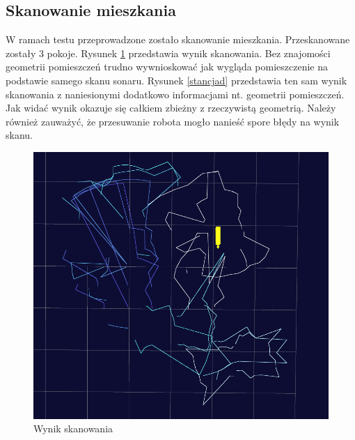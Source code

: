 \documentclass[a4paper,12pt]{article}
\begin{document}
\subsection{Skanowanie mieszkania}
W ramach testu przeprowadzone zostało skanowanie mieszkania. Przeskanowane zostały 3 pokoje. Rysunek \ref{stancjac} przedstawia wynik skanowania. Bez znajomości geometrii pomieszczeń trudno wywnioskować jak wygląda pomieszczenie na podstawie samego skanu sonaru. Rysunek \ref{stancjad} przedstawia ten sam wynik skanowania z naniesionymi dodatkowo informacjami nt. geometrii pomieszczeń. Jak widać wynik okazuje się całkiem zbieżny z rzeczywistą geometrią. Należy również zauważyć, że przesuwanie robota mogło nanieść spore błędy na wynik skanu. 
\begin{figure}[p]
\centering
\includegraphics[width=\linewidth]{stancjac.png}
\caption{Wynik skanowania}
\label{stancjac}
\end{figure}
\end{document}
